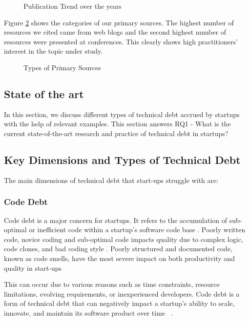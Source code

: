 \begin{figure}
  \caption{Publication Trend over the years}
 \label{fig:Trend}
\end{figure}

Figure \ref{fig:Sources} shows the categories of our primary sources. The highest number of resources we cited came from web blogs and the second highest number of resources were presented at conferences. This clearly shows high practitioners’ interest in the topic under study. 

\begin{figure}
  \caption{Types of Primary Sources}
 \label{fig:Sources}
\end{figure}

\subsection{State of the art}
In this section, we discuss different types of technical debt accrued by startups with the help of relevant examples. This section answers RQ1 - What is the current state-of-the-art research and practice of technical debt in startups?

\subsection{Key Dimensions and Types of Technical Debt}
The main dimensions of technical debt that start-ups struggle with are:

\subsubsection{Code Debt} 
Code debt is a major concern for startups. It refers to the accumulation of sub-optimal or inefficient code within a startup's software code base . Poorly written code, novice coding and sub-optimal code impacts quality due to complex logic, code clones, and bad coding style . Poorly structured and documented code, known as code smells, have the most severe impact on both productivity and quality in start-ups ~\cite{Klotins2018/3183519.3183539}

This can occur due to various reasons such as time constraints, resource limitations, evolving requirements, or inexperienced developers. Code debt is a form of technical debt that can negatively impact a startup's ability to scale, innovate, and maintain its software product over time ~\cite{FowlerBottlenecks, Qualityv77:online}.

